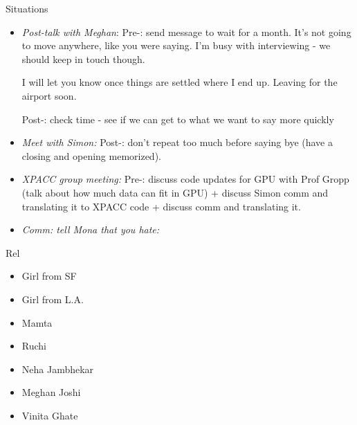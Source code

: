\documentclass[serif, mathserif, final]{beamer}
\begin{document}
\begin{frame}
\begin{columns}
\begin{column}{0.20\linewidth}
\begin{block}{Situations}
\begin{itemize}
          \tiny \item \tiny \textit{Post-talk with Meghan}: Pre-: send
          message to wait for a month. 
          It's not going to move anywhere, like you were saying. 
          I'm busy with interviewing - we should keep in touch
          though. 

          I will let you know once things are settled where I end up.  
          Leaving for the airport soon. 

          Post-: check time - see if we can get to what we want to say
          more quickly 

        \item \tiny \textit{Meet with Simon:} Post-: don't repeat too
          much before saying bye (have a closing and opening
          memorized). 

        \item \tiny \textit{XPACC group meeting:} Pre-: discuss code
          updates for GPU with Prof Gropp (talk about how much data
          can fit in GPU) + discuss Simon comm and translating it to
          XPACC code + discuss comm and translating it. 

        \item \tiny \textit{Comm: tell Mona that you hate:} 
    \end{itemize} 
        
      \end{block}
      
\begin{block}{Rel}
  \begin{itemize} 
    \small \item \small Girl from SF 
    \small \item \small Girl from L.A. 
    \small \item \small Mamta 


    \small \item \small Ruchi
    \small \item \small Neha Jambhekar 
    \small \item \small Meghan Joshi 
    \small \item \small Vinita Ghate 
  \end{itemize} 
\end{block} 
\end{column}%

\end{columns}

\end{frame}
\end{document}
